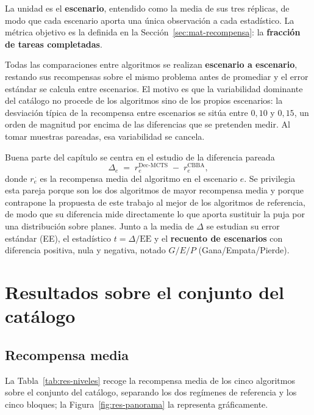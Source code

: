 La unidad es el \textbf{escenario}, entendido como la media de sus tres réplicas, de modo que cada escenario aporta una única observación a cada estadístico. La métrica objetivo es la definida en la Sección~\ref{sec:mat-recompensa}: la \textbf{fracción de tareas completadas}.

Todas las comparaciones entre algoritmos se realizan \textbf{escenario a escenario}, restando sus recompensas sobre el mismo problema antes de promediar y el error estándar se calcula entre escenarios. El motivo es que la variabilidad dominante del catálogo no procede de los algoritmos sino de los propios escenarios: la desviación típica de la recompensa entre escenarios se sitúa entre $0{,}10$ y $0{,}15$, un orden de magnitud por encima de las diferencias que se pretenden medir. Al tomar muestras pareadas, esa variabilidad se cancela.

Buena parte del capítulo se centra en el estudio de la diferencia pareada
\begin{equation} \label{eq:delta}
    \Delta_e \;=\; r_e^{\mathrm{Dec\text{-}MCTS}} \;-\; r_e^{\mathrm{CBBA}},
\end{equation}
donde $r_e^{\,\cdot}$ es la recompensa media del algoritmo en el escenario $e$. Se privilegia esta pareja porque son los dos algoritmos de mayor recompensa media y porque contrapone la propuesta de este trabajo al mejor de los algoritmos de referencia, de modo que su diferencia mide directamente lo que aporta sustituir la puja por una distribución sobre planes. Junto a la media de $\Delta$ se estudian su error estándar (EE), el estadístico $t=\Delta/\mathrm{EE}$ y el \textbf{recuento de escenarios} con diferencia positiva, nula y negativa, notado $G/E/P$ (Gana/Empata/Pierde).

\section{Resultados sobre el conjunto del catálogo} \label{sec:exp-agregado}

\subsection{Recompensa media} \label{subsec:exp-niveles}

La Tabla~\ref{tab:res-niveles} recoge la recompensa media de los cinco algoritmos sobre el conjunto del catálogo, separando los dos regímenes de referencia y los cinco bloques; la Figura~\ref{fig:res-panorama} la representa gráficamente.

